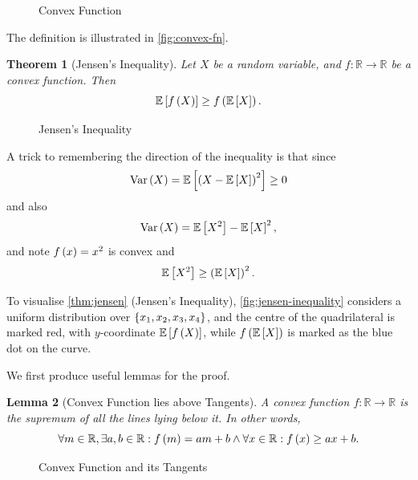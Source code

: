 \documentclass{article}
\newtheorem{theorem}{Theorem}[section]
\newtheorem{lemma}[theorem]{Lemma}
\theoremstyle{definition}
\theoremstyle{remark}
\newcommand{\RR}{\mathbb{R}}
\newcommand{\Expt}{\mathbb{E}}
\newcommand{\functiondomain}[3]{#1:#2\to #3}
\newcommand{\Var}{\operatorname{Var}}
\begin{document}
\begin{figure}[ht!]
    \centering
    \par


    \caption{Convex Function}
    \label{fig:convex-fn}
\end{figure}

The definition is illustrated in \autoref{fig:convex-fn}.

\begin{theorem}[Jensen's Inequality]
    \label{thm:jensen}%
    Let \(X\) be a random variable, and \(\functiondomain{f}{\RR}{\RR}\) be a convex function. Then
    \[
        \Expt\bqty{f\pqty{X}} \geq f\pqty{\Expt\bqty{X}}.
    \]
\end{theorem}

\begin{figure}[ht!]
    \centering
    \par


    \caption{Jensen's Inequality}
    \label{fig:jensen-inequality}
\end{figure}

A trick to remembering the direction of the inequality is that since
\[
    \Var\pqty{X} = \Expt\bqty{\pqty{X - \Expt\bqty{X}}^2} \geq 0
\]
and also
\[
    \Var\pqty{X} = \Expt\bqty{X^2} - \Expt\bqty{X}^2,
\]
and note \(f\left(x\right) = x^2\) is convex and
\[
    \Expt\bqty{X^2} \geq \pqty{\Expt\bqty{X}}^2.
\]

To visualise \autoref{thm:jensen} (Jensen's Inequality), \autoref{fig:jensen-inequality} considers a uniform distribution over \(\left\{x_1, x_2, x_3, x_4\right\}\), and the centre of the quadrilateral is marked red, with \(y\)-coordinate \(\Expt\bqty{f\pqty{X}}\), while \(f\pqty{\Expt\bqty{X}}\) is marked as the blue dot on the curve.

We first produce useful lemmas for the proof.

\begin{lemma}[Convex Function lies above Tangents]
    \label{lem:convex-fn-tangents}%
    A convex function \(\functiondomain{f}{\RR}{\RR}\) is the supremum of all the lines lying below it. In other words,
    \[
        \forall m \in \RR, \exists a, b \in \RR: f\pqty{m} = am + b \land \forall x \in \RR: f\pqty{x} \geq ax + b.
    \]
\end{lemma}

\begin{figure}[ht!]
    \centering
    \par


    \caption{Convex Function and its Tangents}
    \label{fig:convex-fn-tangents}
\end{figure}
\end{document}
